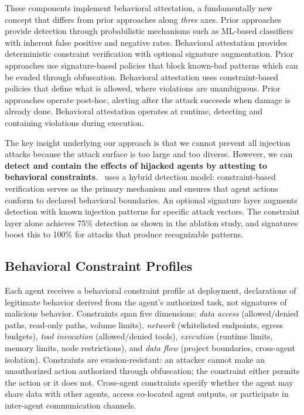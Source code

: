 These components implement behavioral attestation, a fundamentally new concept that differs from prior approaches along \textit{three} axes. Prior approaches provide detection through probabilistic mechanisms such as ML-based classifiers with inherent false positive and negative rates. Behavioral attestation provides deterministic constraint verification with optional signature augmentation. Prior approaches use signature-based policies that block known-bad patterns which can be evaded through obfuscation. Behavioral attestation uses constraint-based policies that define what is allowed, where violations are unambiguous. Prior approaches operate post-hoc, alerting after the attack succeeds when damage is already done. Behavioral attestation operates at runtime, detecting and containing violations during execution.

The key insight underlying our approach is that we cannot prevent all injection attacks because the attack surface is too large and too diverse. However, we can \textbf{detect and contain the effects of hijacked agents by attesting to behavioral constraints}. \projectname~uses a hybrid detection model: constraint-based verification serves as the primary mechanism and ensures that agent actions conform to declared behavioral boundaries. An optional signature layer augments detection with known injection patterns for specific attack vectors. The constraint layer alone achieves 75\% detection as shown in the ablation study, and signatures boost this to 100\% for attacks that produce recognizable patterns.

\subsection{Behavioral Constraint Profiles}

Each agent receives a behavioral constraint profile at deployment, declarations of legitimate behavior derived from the agent's authorized task, not signatures of malicious behavior. Constraints span five dimensions: \textit{data access} (allowed/denied paths, read-only paths, volume limits), \textit{network} (whitelisted endpoints, egress budgets), \textit{tool invocation} (allowed/denied tools), \textit{execution} (runtime limits, memory limits, node restrictions), and \textit{data flow} (project boundaries, cross-agent isolation). Constraints are evasion-resistant: an attacker cannot make an unauthorized action authorized through obfuscation; the constraint either permits the action or it does not. Cross-agent constraints specify whether the agent may share data with other agents, access co-located agent outputs, or participate in inter-agent communication channels.


